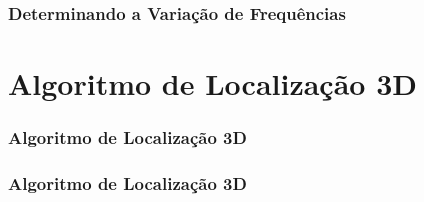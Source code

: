 \begin{frame}
    \frametitle{Determinando a Variação de Frequências}

\end{frame}

\section{Algoritmo de Localização 3D}
\begin{frame}
    \frametitle{Algoritmo de Localização 3D}

\end{frame}

\begin{frame}
    \frametitle{Algoritmo de Localização 3D}

\end{frame}
